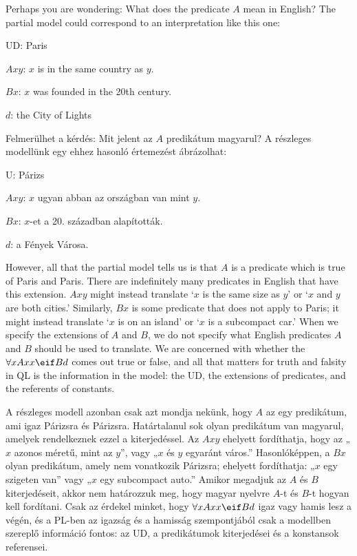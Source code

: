 Perhaps you are wondering: What does the predicate $A$ mean in English? The partial model could correspond to an interpretation like this one:
\begin{ekey}
\item[UD:] Paris
\item[$Axy$:] $x$ is in the same country as $y$.
\item[$Bx$:] $x$ was founded in the 20th century.
\item[$d$:] the City of Lights
\end{ekey}

Felmerülhet a kérdés: Mit jelent az $A$ predikátum magyarul? A részleges modellünk egy ehhez hasonló értemezést ábrázolhat:
\begin{ekey}
\item[U:] Párizs
\item[$Axy$:] $x$ ugyan abban az országban van mint $y$.
\item[$Bx$:] $x$-et a 20. században alapították.
\item[$d$:] a Fények Városa.
\end{ekey}



However, all that the partial model tells us is that $A$ is a predicate which is true of Paris and Paris. There are indefinitely many predicates in English that have this extension. $Axy$ might instead translate `$x$ is the same size as $y$' or `$x$ and $y$ are both cities.' Similarly, $Bx$ is some predicate that does not apply to Paris; it might instead translate `$x$ is on an island' or `$x$ is a subcompact car.' When we specify the extensions of $A$ and $B$, we do not specify what English predicates $A$ and $B$ should be used to translate. We are concerned with whether the $\forall xAxx \eif Bd$ comes out true or false, and all that matters for truth and falsity in QL is the information in the model: the UD, the extensions of predicates, and the referents of constants.

A részleges modell azonban csak azt mondja nekünk, hogy $A$ az egy predikátum, ami igaz Párizsra és Párizsra. Határtalanul sok olyan predikátum van magyarul, amelyek rendelkeznek ezzel a kiterjedéssel. Az $Axy$ ehelyett fordíthatja, hogy az „$x$ azonos méretű, mint az $y$”, vagy „$x$ és $y$ egyaránt város.” Hasonlóképpen, a $Bx$ olyan predikátum, amely nem vonatkozik Párizsra; ehelyett fordíthatja: „$x$ egy szigeten van” vagy „$x$ egy subcompact auto.” Amikor megadjuk az $A$ és $B$ kiterjedéseit, akkor nem határozzuk meg, hogy magyar nyelvre $A$-t és $B$-t hogyan kell fordítani. Csak az érdekel minket, hogy $\forall xAxx \eif Bd$ igaz vagy hamis lesz a végén, és a PL-ben az igazság és a hamisság szempontjából csak a modellben szereplő információ fontos: az UD, a predikátumok kiterjedései és a konstansok referensei.


